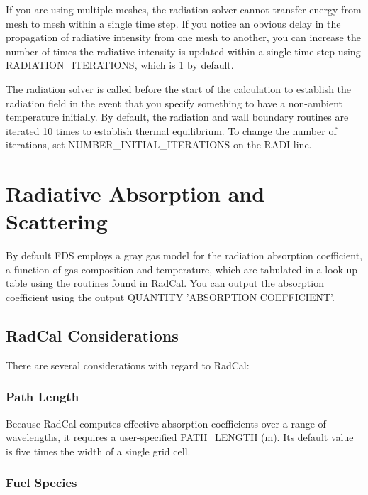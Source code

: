 \documentclass[11pt]{book}
\begin{document}
If you are using multiple meshes, the radiation solver cannot transfer energy from mesh to mesh within a single time step. If you notice an obvious delay in the propagation of radiative intensity from one mesh to another, you can increase the number of times the radiative intensity is updated within a single time step using {\ct RADIATION\_ITERATIONS}, which is 1 by default.

The radiation solver is called before the start of the calculation to establish the radiation field in the event that you specify something to have a non-ambient temperature initially. By default, the radiation and wall boundary routines are iterated 10 times to establish thermal equilibrium. To change the number of iterations, set {\ct NUMBER\_INITIAL\_ITERATIONS} on the {\ct RADI} line.



\section{Radiative Absorption and Scattering}
\label{info:RADI_RADCAL_Absorption}

By default FDS employs a gray gas model for the radiation absorption coefficient, a function of gas composition and temperature, which are tabulated in a look-up table using the routines found in RadCal. You can output the absorption coefficient using the output {\ct QUANTITY} {\ct 'ABSORPTION COEFFICIENT'}.

\subsection{RadCal Considerations}

\label{info:RadCal}

There are several considerations with regard to RadCal:

\subsubsection{Path Length}

Because RadCal computes effective absorption coefficients over a range of wavelengths, it requires a user-specified {\ct PATH\_LENGTH} (m).
Its default value is five times the width of a single grid cell.

\subsubsection{Fuel Species}
\end{document}
